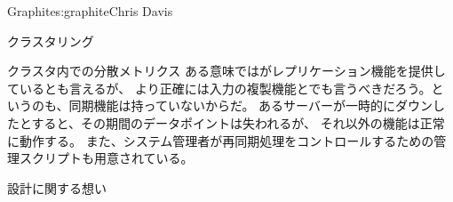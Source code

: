 \begin{aosachapter}{Graphite}{s:graphite}{Chris Davis}
\begin{aosasect1}{クラスタリング}
\begin{aosasect2}{クラスタ内での分散メトリクス}
ある意味ではがレプリケーション機能を提供しているとも言えるが、
より正確には入力の複製機能とでも言うべきだろう。というのも、同期機能は持っていないからだ。
あるサーバーが一時的にダウンしたとすると、その期間のデータポイントは失われるが、
それ以外の機能は正常に動作する。
また、システム管理者が再同期処理をコントロールするための管理スクリプトも用意されている。

\end{aosasect2}

\end{aosasect1}

\begin{aosasect1}{設計に関する想い}


\end{aosasect1}
\end{aosachapter}
